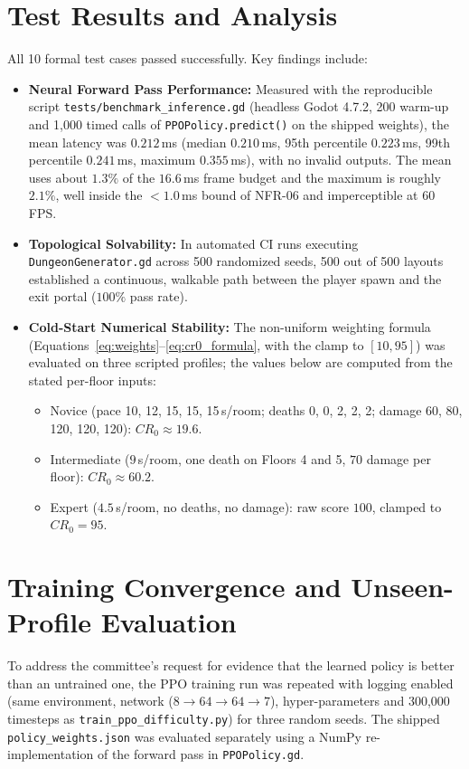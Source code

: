 \section{Test Results and Analysis}
All 10 formal test cases passed successfully. Key findings include:
\begin{itemize}
    \item \textbf{Neural Forward Pass Performance:} Measured with the reproducible script \texttt{tests/benchmark\_inference.gd} (headless Godot 4.7.2, 200 warm-up and 1,000 timed calls of \texttt{PPOPolicy.predict()} on the shipped weights), the mean latency was $0.212$\,ms (median $0.210$\,ms, 95th percentile $0.223$\,ms, 99th percentile $0.241$\,ms, maximum $0.355$\,ms), with no invalid outputs. The mean uses about $1.3\%$ of the $16.6$\,ms frame budget and the maximum is roughly $2.1\%$, well inside the $<1.0$\,ms bound of NFR-06 and imperceptible at 60\,FPS.
    \item \textbf{Topological Solvability:} In automated CI runs executing \texttt{DungeonGenerator.gd} across 500 randomized seeds, 500 out of 500 layouts established a continuous, walkable path between the player spawn and the exit portal ($100\%$ pass rate).
    \item \textbf{Cold-Start Numerical Stability:} The non-uniform weighting formula (Equations~\ref{eq:weights}--\ref{eq:cr0_formula}, with the clamp to $[10, 95]$) was evaluated on three scripted profiles; the values below are computed from the stated per-floor inputs:
    \begin{itemize}
        \item Novice (pace 10, 12, 15, 15, 15\,s/room; deaths 0, 0, 2, 2, 2; damage 60, 80, 120, 120, 120): $CR_0 \approx 19.6$.
        \item Intermediate ($9$\,s/room, one death on Floors 4 and 5, $70$ damage per floor): $CR_0 \approx 60.2$.
        \item Expert ($4.5$\,s/room, no deaths, no damage): raw score $100$, clamped to $CR_0 = 95$.
    \end{itemize}
\end{itemize}


\section{Training Convergence and Unseen-Profile Evaluation}
\label{sec:policy_eval}
To address the committee's request for evidence that the learned policy is better than an untrained one, the PPO training run was repeated with logging enabled (same environment, network ($8\rightarrow64\rightarrow64\rightarrow7$), hyper-parameters and 300{,}000 timesteps as \texttt{train\_ppo\_difficulty.py}) for three random seeds. The shipped \texttt{policy\_weights.json} was evaluated separately using a NumPy re-implementation of the forward pass in \texttt{PPOPolicy.gd}.


